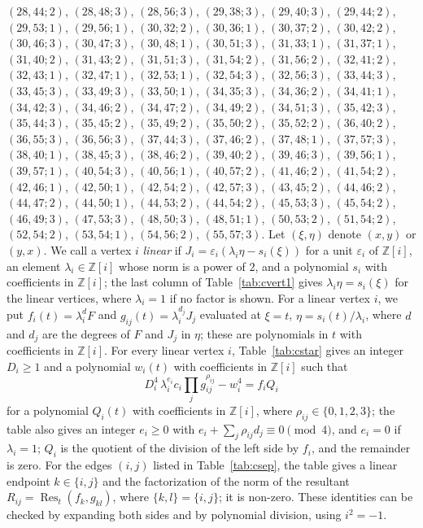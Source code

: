 \documentclass[11pt]{article}
\newcommand{\Z}{\mathbb{Z}}
\begin{document}
$(28,44;2)$, $(28,48;3)$, $(28,56;3)$, $(29,38;3)$, $(29,40;3)$, $(29,44;2)$, $(29,53;1)$, $(29,56;1)$, $(30,32;2)$, $(30,36;1)$, $(30,37;2)$, $(30,42;2)$, $(30,46;3)$, $(30,47;3)$, $(30,48;1)$, $(30,51;3)$, $(31,33;1)$, $(31,37;1)$, $(31,40;2)$, $(31,43;2)$, $(31,51;3)$, $(31,54;2)$, $(31,56;2)$, $(32,41;2)$, $(32,43;1)$, $(32,47;1)$, $(32,53;1)$, $(32,54;3)$, $(32,56;3)$, $(33,44;3)$, $(33,45;3)$, $(33,49;3)$, $(33,50;1)$, $(34,35;3)$, $(34,36;2)$, $(34,41;1)$, $(34,42;3)$, $(34,46;2)$, $(34,47;2)$, $(34,49;2)$, $(34,51;3)$, $(35,42;3)$, $(35,44;3)$, $(35,45;2)$, $(35,49;2)$, $(35,50;2)$, $(35,52;2)$, $(36,40;2)$, $(36,55;3)$, $(36,56;3)$, $(37,44;3)$, $(37,46;2)$, $(37,48;1)$, $(37,57;3)$, $(38,40;1)$, $(38,45;3)$, $(38,46;2)$, $(39,40;2)$, $(39,46;3)$, $(39,56;1)$, $(39,57;1)$, $(40,54;3)$, $(40,56;1)$, $(40,57;2)$, $(41,46;2)$, $(41,54;2)$, $(42,46;1)$, $(42,50;1)$, $(42,54;2)$, $(42,57;3)$, $(43,45;2)$, $(44,46;2)$, $(44,47;2)$, $(44,50;1)$, $(44,53;2)$, $(44,54;2)$, $(45,53;3)$, $(45,54;2)$, $(46,49;3)$, $(47,53;3)$, $(48,50;3)$, $(48,51;1)$, $(50,53;2)$, $(51,54;2)$, $(52,54;2)$, $(53,54;1)$, $(54,56;2)$, $(55,57;3)$.
Let $(\xi,\eta)$ denote $(x,y)$ or $(y,x)$. We call a vertex $i$ \emph{linear} if $J_i=\varepsilon_i(\lambda_i\eta-s_i(\xi))$ for a unit $\varepsilon_i$ of $\Z[i]$, an element $\lambda_i\in\Z[i]$ whose norm is a power of $2$, and a polynomial $s_i$ with coefficients in $\Z[i]$; the last column of Table~\ref{tab:cvert1} gives $\lambda_i\eta=s_i(\xi)$ for the linear vertices, where $\lambda_i=1$ if no factor is shown. For a linear vertex $i$, we put $f_i(t)=\lambda_i^{d}F$ and $g_{ij}(t)=\lambda_i^{d_j}J_j$ evaluated at $\xi=t$, $\eta=s_i(t)/\lambda_i$, where $d$ and $d_j$ are the degrees of $F$ and $J_j$ in $\eta$; these are polynomials in $t$ with coefficients in $\Z[i]$.
For every linear vertex $i$, Table~\ref{tab:cstar} gives an integer $D_i\geq1$ and a polynomial $w_i(t)$ with coefficients in $\Z[i]$ such that
\begin{equation}\label{eq:cstarlin}
D_i^4\,\lambda_i^{e_i}c_i\prod_jg_{ij}^{\rho_{ij}}-w_i^4=f_iQ_i
\end{equation}
for a polynomial $Q_i(t)$ with coefficients in $\Z[i]$, where $\rho_{ij}\in\{0,1,2,3\}$; the table also gives an integer $e_i\geq0$ with $e_i+\sum_j\rho_{ij}d_j\equiv0\pmod4$, and $e_i=0$ if $\lambda_i=1$; $Q_i$ is the quotient of the division of the left side by $f_i$, and the remainder is zero.
For the edges $(i,j)$ listed in Table~\ref{tab:csep}, the table gives a linear endpoint $k\in\{i,j\}$ and the factorization of the norm of the resultant $R_{ij}=\operatorname{Res}_t(f_k,g_{kl})$, where $\{k,l\}=\{i,j\}$; it is non-zero.
These identities can be checked by expanding both sides and by polynomial division, using $i^2=-1$.
\end{document}
